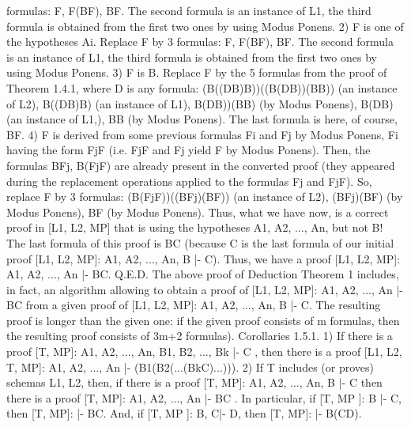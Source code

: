 formulas: F, F\IMPLIES (B\IMPLIES F), B\IMPLIES F. The second formula is an instance of L1, the third formula is obtained
from the first two ones by using Modus Ponens.
2) F is one of the hypotheses Ai. Replace F by 3 formulas: F, F\IMPLIES (B\IMPLIES F), B\IMPLIES F. The second formula is an
instance of L1, the third formula is obtained from the first two ones by using Modus Ponens.
3) F is B. Replace F by the 5 formulas from the proof of Theorem 1.4.1, where D is any formula:
(B\IMPLIES ((D\IMPLIES B)\IMPLIES B))\IMPLIES ((B\IMPLIES (D\IMPLIES B))\IMPLIES (B\IMPLIES B)) (an instance of L2),
B\IMPLIES ((D\IMPLIES B)\IMPLIES B) (an instance of L1),
B\IMPLIES (D\IMPLIES B))\IMPLIES (B\IMPLIES B) (by Modus Ponens),
B\IMPLIES (D\IMPLIES B) (an instance of L1,),
B\IMPLIES B (by Modus Ponens).
The last formula is here, of course, B\IMPLIES F.
4) F is derived from some previous formulas Fi and Fj by Modus Ponens, Fi having the form Fj\IMPLIES F (i.e.
Fj\IMPLIES F and Fj yield F by Modus Ponens). Then, the formulas
B\IMPLIES Fj,
B\IMPLIES (Fj\IMPLIES F)
are already present in the converted proof (they appeared during the replacement operations applied to the
formulas Fj and Fj\IMPLIES F). So, replace F by 3 formulas:
(B\IMPLIES (Fj\IMPLIES F))\IMPLIES ((B\IMPLIES Fj)\IMPLIES (B\IMPLIES F)) (an instance of L2),
(B\IMPLIES Fj)\IMPLIES (B\IMPLIES F) (by Modus Ponens),
B\IMPLIES F (by Modus Ponens).
Thus, what we have now, is a correct proof in [L1, L2, MP] that is using the hypotheses A1, A2, ..., An, but
not B! The last formula of this proof is B\IMPLIES C (because C is the last formula of our initial proof [L1, L2,
MP]: A1, A2, ..., An, B |- C). Thus, we have a proof [L1, L2, MP]: A1, A2, ..., An |- B\IMPLIES C. Q.E.D.
The above proof of Deduction Theorem 1 includes, in fact, an algorithm allowing to obtain a proof of
[L1, L2, MP]: A1, A2, ..., An |- B\IMPLIES C from a given proof of [L1, L2, MP]: A1, A2, ..., An, B |- C. The
resulting proof is longer than the given one: if the given proof consists of m formulas, then the resulting
proof consists of 3m+2 formulas).
Corollaries 1.5.1. 1) If there is a proof [T, MP]: A1, A2, ..., An, B1, B2, ..., Bk |- C , then there is a proof
[L1, L2, T, MP]: A1, A2, ..., An |- (B1\IMPLIES (B2\IMPLIES (...\IMPLIES (Bk\IMPLIES C)...))).
2) If T includes (or proves) schemas L1, L2, then, if there is a proof [T, MP]: A1, A2, ..., An, B |- C then
there is a proof [T, MP]: A1, A2, ..., An |- B\IMPLIES C .
In particular, if [T, MP ]: B |- C, then [T, MP]: |- B\IMPLIES C.
And, if [T, MP ]: B, C|- D, then [T, MP]: |- B\IMPLIES (C\IMPLIES D).
